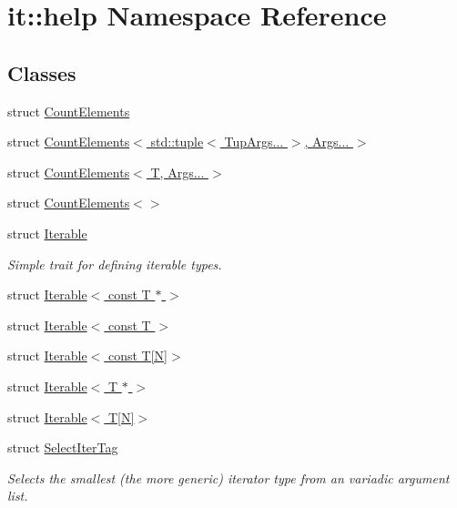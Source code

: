 \hypertarget{namespaceit_1_1help}{}\section{it\+:\+:help Namespace Reference}
\label{namespaceit_1_1help}
\subsection*{Classes}
\begin{DoxyCompactItemize}
\item 
struct \hyperlink{structit_1_1help_1_1CountElements}{Count\+Elements}
\item 
struct \hyperlink{structit_1_1help_1_1CountElements_3_01std_1_1tuple_3_01TupArgs_8_8_8_01_4_00_01Args_8_8_8_01_4}{Count\+Elements$<$ std\+::tuple$<$ Tup\+Args... $>$, Args... $>$}
\item 
struct \hyperlink{structit_1_1help_1_1CountElements_3_01T_00_01Args_8_8_8_01_4}{Count\+Elements$<$ T, Args... $>$}
\item 
struct \hyperlink{structit_1_1help_1_1CountElements_3_4}{Count\+Elements$<$$>$}
\item 
struct \hyperlink{structit_1_1help_1_1Iterable}{Iterable}
\begin{DoxyCompactList}\small\item\em Simple trait for defining iterable types. \end{DoxyCompactList}\item 
struct \hyperlink{structit_1_1help_1_1Iterable_3_01const_01T_01_5_01_4}{Iterable$<$ const T $\ast$ $>$}
\item 
struct \hyperlink{structit_1_1help_1_1Iterable_3_01const_01T_01_4}{Iterable$<$ const T $>$}
\item 
struct \hyperlink{structit_1_1help_1_1Iterable_3_01const_01T[N]_4}{Iterable$<$ const T\mbox{[}\+N\mbox{]}$>$}
\item 
struct \hyperlink{structit_1_1help_1_1Iterable_3_01T_01_5_01_4}{Iterable$<$ T $\ast$ $>$}
\item 
struct \hyperlink{structit_1_1help_1_1Iterable_3_01T[N]_4}{Iterable$<$ T\mbox{[}\+N\mbox{]}$>$}
\item 
struct \hyperlink{structit_1_1help_1_1SelectIterTag}{Select\+Iter\+Tag}
\begin{DoxyCompactList}\small\item\em Selects the smallest (the more generic) iterator type from an variadic argument list. \end{DoxyCompactList}\item 

\end{DoxyCompactItemize}
